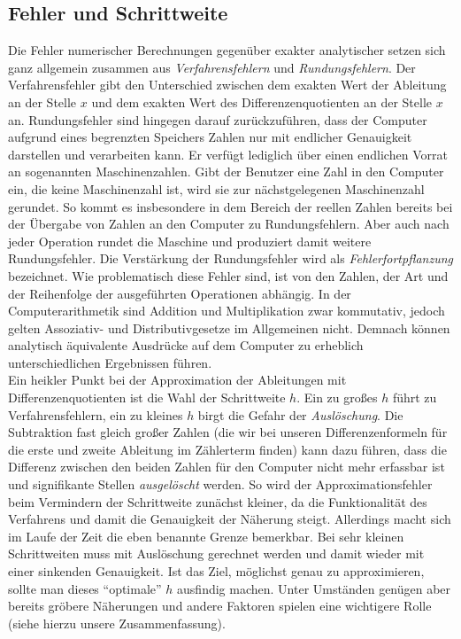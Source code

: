 \documentclass{scrartcl}
\begin{document}
\subsection{Fehler und Schrittweite}
\label{ssec:schrittweite}
Die Fehler numerischer Berechnungen gegenüber exakter analytischer setzen sich ganz allgemein zusammen aus \textit{Verfahrensfehlern} und \textit{Rundungsfehlern}. Der Verfahrensfehler gibt den Unterschied zwischen dem exakten Wert der Ableitung an der Stelle $x$ und dem exakten Wert des Differenzenquotienten an der Stelle $x$ an. Rundungsfehler sind hingegen darauf zurückzuführen, dass der Computer aufgrund eines begrenzten Speichers Zahlen nur mit endlicher Genauigkeit darstellen und verarbeiten kann. Er verfügt lediglich über einen endlichen Vorrat an sogenannten Maschinenzahlen. Gibt der Benutzer eine Zahl in den Computer ein, die keine Maschinenzahl ist, wird sie zur nächstgelegenen Maschinenzahl gerundet. So kommt es insbesondere in dem Bereich der reellen Zahlen bereits bei der Übergabe von Zahlen an den Computer zu Rundungsfehlern. Aber auch nach jeder Operation rundet die Maschine und produziert damit weitere Rundungsfehler. Die Verstärkung der Rundungsfehler wird als \textit{Fehlerfortpflanzung} bezeichnet. Wie problematisch diese Fehler sind, ist von den Zahlen, der Art und der Reihenfolge der ausgeführten Operationen abhängig. In der Computerarithmetik sind Addition und Multiplikation zwar kommutativ, jedoch gelten Assoziativ- und Distributivgesetze im Allgemeinen nicht. Demnach können analytisch äquivalente Ausdrücke auf dem Computer zu erheblich unterschiedlichen Ergebnissen führen. \\
Ein heikler Punkt bei der Approximation der Ableitungen mit Differenzenquotienten ist die Wahl der Schrittweite $h$.
Ein zu großes $h$ führt zu Verfahrensfehlern, ein zu kleines $h$ birgt die Gefahr der \textit{Auslöschung}.
Die Subtraktion fast gleich großer Zahlen (die wir bei unseren Differenzenformeln für die erste und zweite Ableitung im Zählerterm finden) kann dazu führen, dass die Differenz zwischen den beiden Zahlen für den Computer nicht mehr erfassbar ist und signifikante Stellen \textit{ausgelöscht} werden.
So wird der Approximationsfehler beim Vermindern der Schrittweite zunächst kleiner, da die Funktionalität des Verfahrens und damit die Genauigkeit der Näherung steigt.
Allerdings macht sich im Laufe der Zeit die eben benannte Grenze bemerkbar. Bei sehr kleinen Schrittweiten muss mit Auslöschung gerechnet werden und damit wieder mit einer sinkenden Genauigkeit.
Ist das Ziel, möglichst genau zu approximieren, sollte man dieses "`optimale"' $h$ ausfindig machen.
Unter Umständen genügen aber bereits gröbere Näherungen und andere Faktoren spielen eine wichtigere Rolle (siehe hierzu unsere Zusammenfassung). \\
\end{document}
